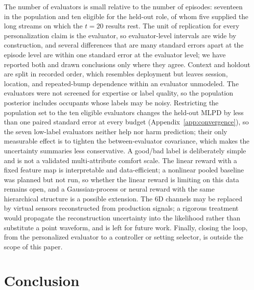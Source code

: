 \documentclass[lettersize,journal]{IEEEtran}
\begin{document}
The number of evaluators is small relative to the number of episodes: seventeen in the population and ten eligible for the held-out role, of whom five supplied the long streams on which the $t=20$ results rest. The unit of replication for every personalization claim is the evaluator, so evaluator-level intervals are wide by construction, and several differences that are many standard errors apart at the episode level are within one standard error at the evaluator level; we have reported both and drawn conclusions only where they agree. Context and holdout are split in recorded order, which resembles deployment but leaves session, location, and repeated-bump dependence within an evaluator unmodeled. The evaluators were not screened for expertise or label quality, so the population posterior includes occupants whose labels may be noisy. Restricting the population set to the ten eligible evaluators changes the held-out MLPD by less than one paired standard error at every budget (Appendix~\ref{app:convergence}), so the seven low-label evaluators neither help nor harm prediction; their only measurable effect is to tighten the between-evaluator covariance, which makes the uncertainty summaries less conservative. A good/bad label is deliberately simple and is not a validated multi-attribute comfort scale. The linear reward with a fixed feature map is interpretable and data-efficient; a nonlinear pooled baseline was planned but not run, so whether the linear reward is limiting on this data remains open, and a Gaussian-process or neural reward with the same hierarchical structure is a possible extension. The 6D channels may be replaced by virtual sensors reconstructed from production signals; a rigorous treatment would propagate the reconstruction uncertainty into the likelihood rather than substitute a point waveform, and is left for future work. Finally, closing the loop, from the personalized evaluator to a controller or setting selector, is outside the scope of this paper.

\section{Conclusion}
\label{sec:conclusion}
\end{document}
